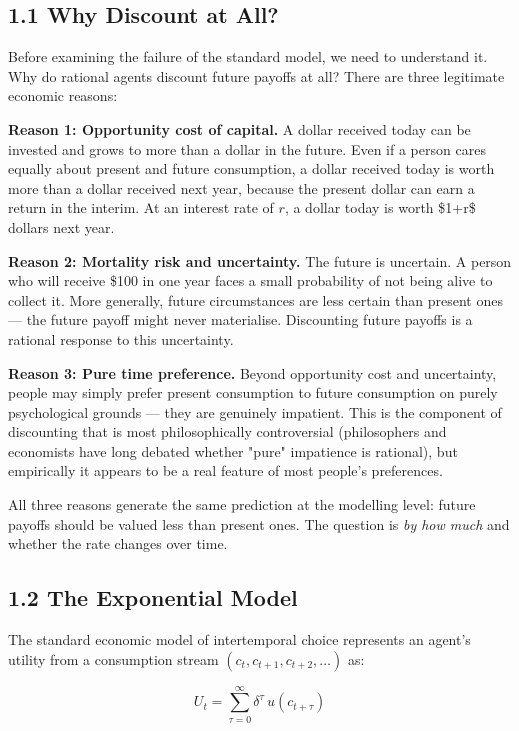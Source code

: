 \documentclass[12pt, letterpaper]{article}
\begin{document}
\subsection{1.1 Why Discount at All?}


Before examining the failure of the standard model, we need to understand it. Why do rational agents discount future payoffs at all? There are three legitimate economic reasons:

\textbf{Reason 1: Opportunity cost of capital.} A dollar received today can be invested and grows to more than a dollar in the future. Even if a person cares equally about present and future consumption, a dollar received today is worth more than a dollar received next year, because the present dollar can earn a return in the interim. At an interest rate of $r$, a dollar today is worth \$1+r\$ dollars next year.

\textbf{Reason 2: Mortality risk and uncertainty.} The future is uncertain. A person who will receive \$100 in one year faces a small probability of not being alive to collect it. More generally, future circumstances are less certain than present ones --- the future payoff might never materialise. Discounting future payoffs is a rational response to this uncertainty.

\textbf{Reason 3: Pure time preference.} Beyond opportunity cost and uncertainty, people may simply prefer present consumption to future consumption on purely psychological grounds --- they are genuinely impatient. This is the component of discounting that is most philosophically controversial (philosophers and economists have long debated whether "pure" impatience is rational), but empirically it appears to be a real feature of most people's preferences.

All three reasons generate the same prediction at the modelling level: future payoffs should be valued less than present ones. The question is \textit{by how much} and whether the rate changes over time.


\subsection{1.2 The Exponential Model}


The standard economic model of intertemporal choice represents an agent's utility from a consumption stream $(c_t, c_{t+1}, c_{t+2}, \ldots)$ as:

$$U_t = \sum_{\tau=0}^{\infty} \delta^\tau \, u(c_{t+\tau})$$
\end{document}
